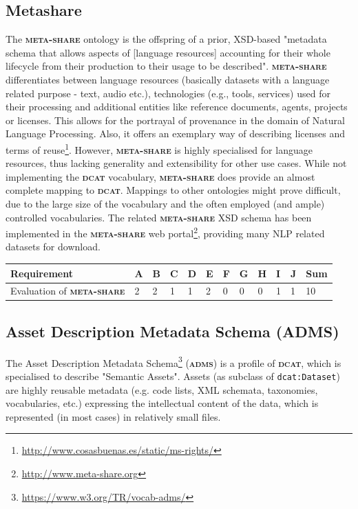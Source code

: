 \documentclass[a4paper,english,twoside,BCOR1.5cm,headsepline,DIV12,appendixprefix,final,12pt]{scrbook}
\newcommand{\dcat}{{\scshape\bfseries dcat}\xspace}
\newcommand{\adms}{{\scshape\bfseries adms}\xspace}
\newcommand{\metashare}{{\scshape\bfseries meta-share}\xspace}
\newcommand{\prop}[1]{{{\texttt{#1}}}}
\newcommand\footnoteurl[1]{\footnote{\scriptsize\url{#1}}}
\begin{document}
\subsection{Metashare}
\label{sec:metashare}
The \metashare ontology\cite{mccrae_2015_OWLmetashare} is the offspring of a prior, XSD-based \cite{xsd} "metadata schema that allows aspects of [language resources] accounting for their whole lifecycle from their production to their usage to be described"\cite{mccrae_2015_OWLmetashare}.
\metashare differentiates between language resources (basically datasets with a language related purpose - text, audio etc.), technologies (e.g., tools, services) used for their processing and additional entities like reference documents, agents, projects or licenses. This allows for the portrayal of provenance in the domain of Natural Language Processing.
Also, it offers an exemplary way of describing licenses and terms of reuse\footnoteurl{http://www.cosasbuenas.es/static/ms-rights/}. However, \metashare is highly specialised for language resources, thus lacking generality and extensibility for other use cases. While not implementing the \dcat vocabulary, \metashare does provide an almost complete mapping to \dcat. Mappings to other ontologies might prove difficult, due to the large size of the vocabulary and the often employed (and ample) controlled vocabularies. The related \metashare XSD schema has been implemented in the \metashare web portal\footnoteurl{http://www.meta-share.org}, providing many NLP related datasets for download.

\begin{table}[!htbp]
    \centering
    \begin{tabular}{|l|l|l|l|l|l|l|l|l|l|l|l|}
        \hline
        Requirement & A & B & C & D & E & F & G & H & I & J & Sum \\
        \hline
        Evaluation of \metashare & 2 & 2 & 1 & 1 & 2 & 0 & 0 & 0 & 1 & 1 & 10 \\
        \hline
    \end{tabular}
    \label{tab:evalmetashare}
\end{table}

\subsection{Asset Description Metadata Schema (ADMS)}
\label{sec:adms}
The Asset Description Metadata Schema\footnoteurl{https://www.w3.org/TR/vocab-adms/} (\adms) is a profile of \dcat, which is specialised to describe "Semantic Assets".
Assets (as subclass of \prop{dcat:Dataset}) are highly reusable metadata (e.g. code lists, XML schemata, taxonomies, vocabularies, etc.) expressing the intellectual content of the data, which is represented (in most cases) in relatively small files. 
\end{document}
